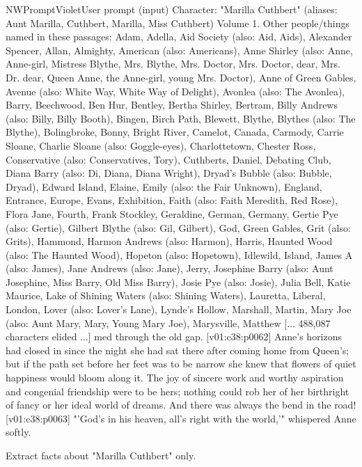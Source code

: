 \begin{nwprompt}{NWPromptViolet}{User prompt (input)}
Character: "Marilla Cuthbert" (aliases: Aunt Marilla, Cuthbert, Marilla, Miss Cuthbert)
Volume 1.
Other people/things named in these passages: Adam, Adella, Aid Society (also: Aid, Aids), Alexander Spencer, Allan, Almighty, American (also: Americans), Anne Shirley (also: Anne, Anne-girl, Mistress Blythe, Mrs. Blythe, Mrs. Doctor, Mrs. Doctor, dear, Mrs. Dr. dear, Queen Anne, the Anne-girl, young Mrs. Doctor), Anne of Green Gables, Avenue (also: White Way, White Way of Delight), Avonlea (also: The Avonlea), Barry, Beechwood, Ben Hur, Bentley, Bertha Shirley, Bertram, Billy Andrews (also: Billy, Billy Booth), Bingen, Birch Path, Blewett, Blythe, Blythes (also: The Blythe), Bolingbroke, Bonny, Bright River, Camelot, Canada, Carmody, Carrie Sloane, Charlie Sloane (also: Goggle-eyes), Charlottetown, Chester Ross, Conservative (also: Conservatives, Tory), Cuthberts, Daniel, Debating Club, Diana Barry (also: Di, Diana, Diana Wright), Dryad's Bubble (also: Bubble, Dryad), Edward Island, Elaine, Emily (also: the Fair Unknown), England, Entrance, Europe, Evans, Exhibition, Faith (also: Faith Meredith, Red Rose), Flora Jane, Fourth, Frank Stockley, Geraldine, German, Germany, Gertie Pye (also: Gertie), Gilbert Blythe (also: Gil, Gilbert), God, Green Gables, Grit (also: Grits), Hammond, Harmon Andrews (also: Harmon), Harris, Haunted Wood (also: The Haunted Wood), Hopeton (also: Hopetown), Idlewild, Island, James A (also: James), Jane Andrews (also: Jane), Jerry, Josephine Barry (also: Aunt Josephine, Miss Barry, Old Miss Barry), Josie Pye (also: Josie), Julia Bell, Katie Maurice, Lake of Shining Waters (also: Shining Waters), Lauretta, Liberal, London, Lover (also: Lover's Lane), Lynde's Hollow, Marshall, Martin, Mary Joe (also: Aunt Mary, Mary, Young Mary Joe), Marysville, Matthew
[... 488,087 characters elided ...]
med through the old gap.
[v01:c38:p0062] Anne's horizons had closed in since the night she had sat there after coming home from Queen's; but if the path set before her feet was to be narrow she knew that flowers of quiet happiness would bloom along it. The joy of sincere work and worthy aspiration and congenial friendship were to be hers; nothing could rob her of her birthright of fancy or her ideal world of dreams. And there was always the bend in the road!
[v01:c38:p0063] "'God's in his heaven, all's right with the world,'" whispered Anne softly.

Extract facts about "Marilla Cuthbert" only.
\end{nwprompt}

